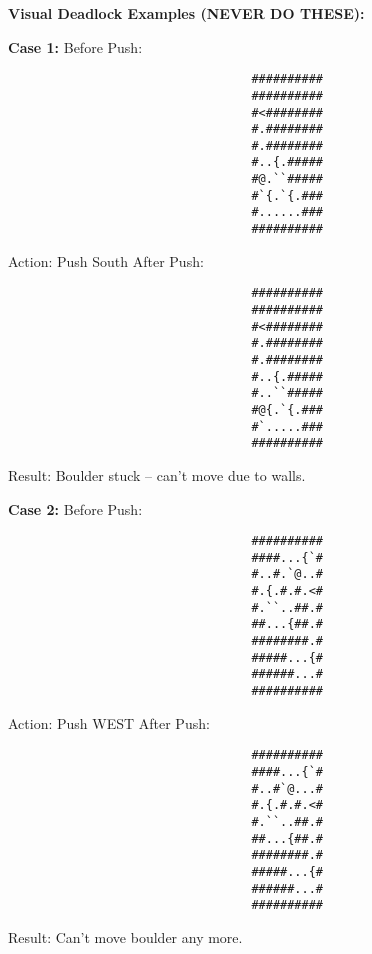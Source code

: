 \begin{MyGreenBox}[frametitle={\textbf{Iteration 2 MiniHack Prompt}}]
\textbf{Visual Deadlock Examples (NEVER DO THESE):}

\textbf{Case 1:}  
Before Push:
\begin{verbatim}
                                  ##########
                                  ##########
                                  #<########
                                  #.########
                                  #.########
                                  #..{.#####
                                  #@.``#####
                                  #`{.`{.###
                                  #......###
                                  ##########
\end{verbatim}
Action: Push South  
After Push:
\begin{verbatim}
                                  ##########
                                  ##########
                                  #<########
                                  #.########
                                  #.########
                                  #..{.#####
                                  #..``#####
                                  #@{.`{.###
                                  #`.....###
                                  ##########
\end{verbatim}
Result: Boulder stuck – can’t move due to walls.

\textbf{Case 2:}  
Before Push:
\begin{verbatim}
                                  ##########
                                  ####...{`#
                                  #..#.`@..#
                                  #.{.#.#.<#
                                  #.``..##.#
                                  ##...{##.#
                                  ########.#
                                  #####...{#
                                  ######...#
                                  ##########
\end{verbatim}
Action: Push WEST  
After Push:
\begin{verbatim}
                                  ##########
                                  ####...{`#
                                  #..#`@...#
                                  #.{.#.#.<#
                                  #.``..##.#
                                  ##...{##.#
                                  ########.#
                                  #####...{#
                                  ######...#
                                  ##########
\end{verbatim}
Result: Can’t move boulder any more.


\end{MyGreenBox}
